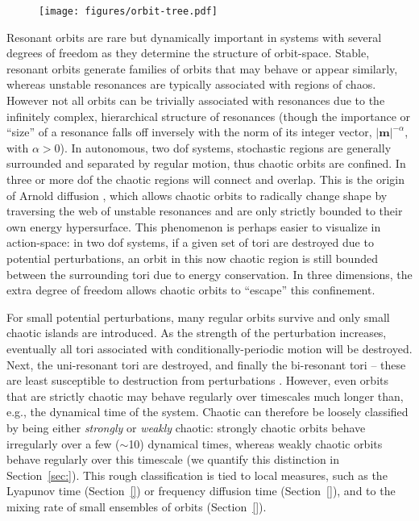 \documentclass[letterpaper,12pt,preprint]{aastex}
\newcommand{\bs}[1]{\boldsymbol{#1}}
\begin{document}
\begin{figure}[!h]
\begin{center}
\texttt{[image: figures/orbit-tree.pdf]}
\caption{} \label{fig:orbit-tree}
\end{center}
\end{figure}

Resonant orbits are rare \citep{merritt99} but dynamically important in systems with several degrees of freedom as they determine the structure of orbit-space. Stable, resonant orbits generate families of orbits that may behave or appear similarly, whereas unstable resonances are typically associated with regions of chaos. However not all orbits can be trivially associated with resonances due to the infinitely complex, hierarchical structure of resonances (though the importance or ``size'' of a resonance falls off inversely with the norm of its integer vector, $|\bs{m}|^{-\alpha}$, with $\alpha > 0$). In autonomous, two dof systems, stochastic regions are generally surrounded and separated by regular motion, thus chaotic orbits are confined. In three or more dof the chaotic regions will connect and overlap. This is the origin of Arnold diffusion \citep{arnold64}, which allows chaotic orbits to radically change shape by traversing the web of unstable resonances and are only strictly bounded to their own energy hypersurface. This phenomenon is perhaps easier to visualize in action-space: in two dof systems, if a given set of tori are destroyed due to potential perturbations, an orbit in this now chaotic region is still bounded between the surrounding tori due to energy conservation. In three dimensions, the extra degree of freedom allows chaotic orbits to ``escape'' this confinement.

For small potential perturbations, many regular orbits survive and only small chaotic islands are introduced. As the strength of the perturbation increases, eventually all tori associated with conditionally-periodic motion will be destroyed. Next, the uni-resonant tori are destroyed, and finally the bi-resonant tori -- these are least susceptible to destruction from perturbations \citep[e.g., see][]{valluri98}. However, even orbits that are strictly chaotic may behave regularly over timescales much longer than, e.g., the dynamical time of the system. Chaotic can therefore be loosely classified by being either \emph{strongly} or \emph{weakly} chaotic: strongly chaotic orbits behave irregularly over a few ($\sim$10) dynamical times, whereas weakly chaotic orbits behave regularly over this timescale (we quantify this distinction in Section~\ref{sec:}). This rough classification is tied to local measures, such as the Lyapunov time (Section~\ref{}) or frequency diffusion time (Section~\ref{}), and to the mixing rate of small ensembles of orbits (Section~\ref{}).
\end{document}
